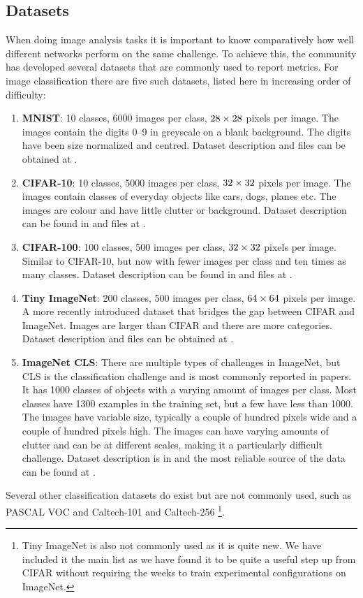 \subsection{Datasets}
When doing image analysis tasks it is important to know comparatively how well
different networks perform on the same challenge. To achieve this, the
community has developed several datasets that are commonly used to report
metrics. For image classification there are five such datasets, listed here in
increasing order of difficulty:
\begin{enumerate}
  \item \textbf{MNIST}: 10 classes, 6000 images per class, $28\times 28$ pixels per image.
    The images contain the digits 0--9 in greyscale on a blank background. The
    digits have been size normalized and centred. Dataset description and files can be obtained
    at \cite{lecun_modified_1998}.
  \item \textbf{CIFAR-10}: 10 classes, 5000 images per class, $32\times 32$ pixels per image.
    The images contain classes of everyday objects like cars, dogs, planes etc.
    The images are colour and have little clutter or background. Dataset
    description can be found in \cite{krizhevsky_learning_2009} and files at
    \cite{krizhevsky_cifar_2009}.
  \item \textbf{CIFAR-100}: 100 classes, 500 images per class, $32\times 32$ pixels per image.
    Similar to CIFAR-10, but now with fewer images per class and ten times as
    many classes. Dataset description can be found in
    \cite{krizhevsky_learning_2009} and files at \cite{krizhevsky_cifar_2009}.
  \item \textbf{Tiny ImageNet}: 200 classes, 500 images per class,
    $64 \times 64$ pixels per image. A more recently introduced dataset that bridges
    the gap between CIFAR and ImageNet. Images are larger than CIFAR and there
    are more categories. Dataset description and files can be obtained at \cite{li_tiny_2017}.
  \item \textbf{ImageNet CLS}: There are multiple types of challenges in ImageNet, but CLS
    is the classification challenge and is most commonly reported in papers.
    It has 1000 classes of objects with a varying amount of images per class.
    Most classes have 1300 examples in the training set, but a few have less
    than 1000. The images have variable size, typically a couple of hundred
    pixels wide and a couple of hundred pixels high. The images can have varying
    amounts of clutter and can be at different scales, making it a particularly
    difficult challenge. Dataset description is in
    \cite{russakovsky_imagenet_2014} and the most reliable source of the data
    can be found at \cite{stanford_vision_lab_imagenet_2017}.
\end{enumerate}
Several other classification datasets do exist but are not commonly used, such
as PASCAL VOC \cite{Everingham15} and Caltech-101 and Caltech-256
\cite{li_fei-fei_learning_2004}\footnote{Tiny ImageNet is also not commonly
used as it is quite new. We have included it the main list as we have found it
to be quite a useful step up from CIFAR without requiring the weeks to train
experimental configurations on ImageNet.}.


